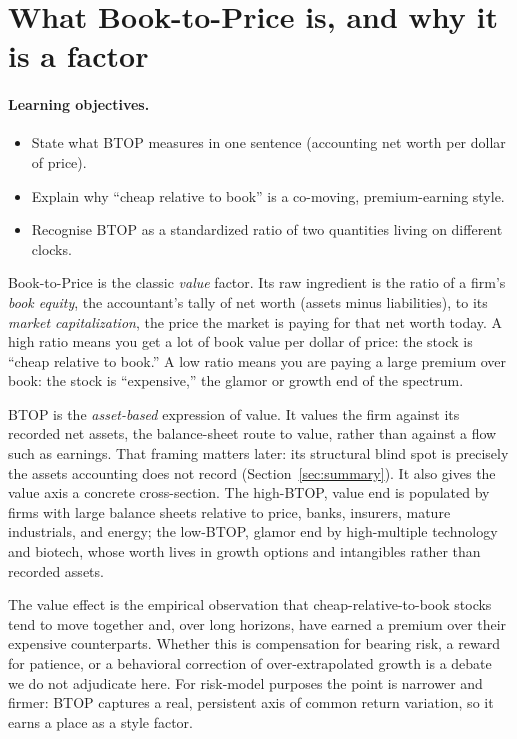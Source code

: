\documentclass[11pt]{article}
\theoremstyle{definition}
\theoremstyle{plain}
\theoremstyle{remark}
\begin{document}
\tableofcontents
\bigskip

\section{What Book-to-Price is, and why it is a factor}\label{sec:what}

\paragraph{Learning objectives.}
\begin{itemize}[leftmargin=1.4em,nosep]
  \item State what BTOP measures in one sentence (accounting net worth per dollar of price).
  \item Explain why ``cheap relative to book'' is a co-moving, premium-earning style.
  \item Recognise BTOP as a standardized ratio of two quantities living on different clocks.
\end{itemize}

Book-to-Price is the classic \emph{value} factor. Its raw ingredient is the ratio of a firm's \emph{book equity}, the accountant's tally of net worth (assets minus liabilities), to its \emph{market capitalization}, the price the market is paying for that net worth today. A high ratio means you get a lot of book value per dollar of price: the stock is ``cheap relative to book.'' A low ratio means you are paying a large premium over book: the stock is ``expensive,'' the glamor or growth end of the spectrum.

BTOP is the \emph{asset-based} expression of value. It values the firm against its recorded net assets, the balance-sheet route to value, rather than against a flow such as earnings. That framing matters later: its structural blind spot is precisely the assets accounting does not record (Section~\ref{sec:summary}). It also gives the value axis a concrete cross-section. The high-BTOP, value end is populated by firms with large balance sheets relative to price, banks, insurers, mature industrials, and energy; the low-BTOP, glamor end by high-multiple technology and biotech, whose worth lives in growth options and intangibles rather than recorded assets.

The value effect is the empirical observation that cheap-relative-to-book stocks tend to move together and, over long horizons, have earned a premium over their expensive counterparts. Whether this is compensation for bearing risk, a reward for patience, or a behavioral correction of over-extrapolated growth is a debate we do not adjudicate here. For risk-model purposes the point is narrower and firmer: BTOP captures a real, persistent axis of common return variation, so it earns a place as a style factor.
\end{document}
